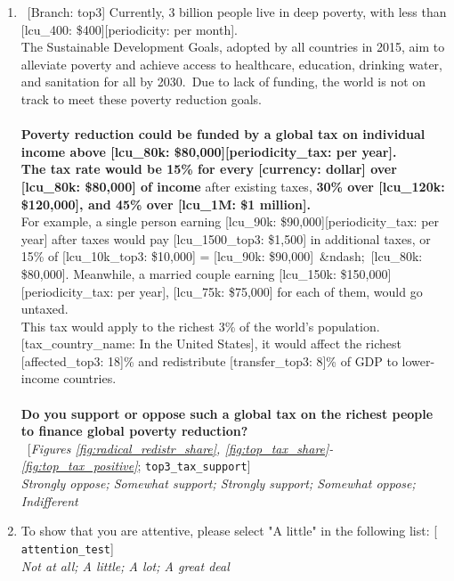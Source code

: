 \begin{enumerate}[resume]
\item ~[Branch: top3] \label{q:top3_tax_support} Currently, 3 billion people live in deep poverty, with less than [lcu\_400: \$400][periodicity: per month].\\The Sustainable Development Goals, adopted by all countries in 2015, aim to alleviate poverty and achieve access to healthcare, education, drinking water, and sanitation for all by 2030.~Due to lack of funding, the world is not on track to meet these poverty reduction goals.\\\\\textbf{Poverty reduction could be funded by a global tax on individual income above [lcu\_80k: \$80,000][periodicity\_tax: per year].~\\The tax rate would be 15\% for every [currency: dollar] over [lcu\_80k: \$80,000] of income} after existing taxes, \textbf{30\% over [lcu\_120k: \$120,000], and 45\% over [lcu\_1M: \$1 million].~}\\For example, a single person earning [lcu\_90k: \$90,000][periodicity\_tax: per year] after taxes would pay [lcu\_1500\_top3: \$1,500] in additional taxes, or 15\% of [lcu\_10k\_top3: \$10,000] = [lcu\_90k: \$90,000]~\&ndash;~[lcu\_80k: \$80,000]. Meanwhile, a married couple earning [lcu\_150k: \$150,000][periodicity\_tax: per year], [lcu\_75k: \$75,000] for each of them, would go untaxed.\\This tax would apply to the richest 3\% of the world's population. [tax\_country\_name: In the United States], it would affect the richest [affected\_top3: 18]\% and redistribute [transfer\_top3: 8]\% of GDP to lower-income countries.\\\\\textbf{Do you support or oppose such a global tax on the richest people to finance global poverty reduction?}\\ 
~[\textit{Figures \ref{fig:radical_redistr_share}, \ref{fig:top_tax_share}-\ref{fig:top_tax_positive}}; 
\verb|top3_tax_support|]
  \\ \textit{Strongly oppose; Somewhat support; Strongly support; Somewhat oppose; Indifferent}

\item  \label{q:attention_test} To show that you are attentive, please select "A little" in the following list: [%
\verb|attention_test|]
  \\ \textit{Not at all; A little; A lot; A great deal}

\end{enumerate} 

